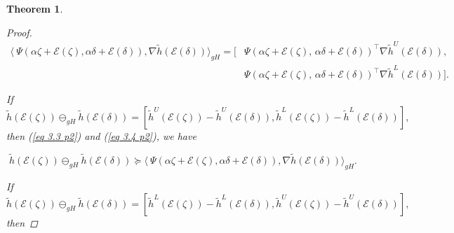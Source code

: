 \documentclass[12pt, reqno]{amsart}
\newtheorem{theorem}{Theorem}[section]
\theoremstyle{definition}
\theoremstyle{remark}
\numberwithin{equation}{section}
\begin{document}
\begin{theorem}
\begin{proof}
\begin{equation*}
\begin{aligned}
    \langle\ {\Psi}( {\alpha} \mathit{\zeta} + \mathcal{\mathcal{E}}(\mathit{\zeta} ), {\alpha}\mathit{\delta} + \mathcal{\mathcal{E}}(\mathit{\delta} )),\nabla  \tilde{h}( \mathcal{\mathcal{E}}(\mathit{\delta} ))\rangle_{gH}
    = \big[
    &\Psi(\alpha \mathit{\zeta}  + \mathcal{\mathcal{E}}(\mathit{\zeta} ),\, \alpha \mathit{\delta}  + \mathcal{\mathcal{E}}(\mathit{\delta} ))^{\!\top}
    \nabla \tilde{h}^U(\mathcal{\mathcal{E}}(\mathit{\delta} )), \\
    &\Psi(\alpha \mathit{\zeta}  + \mathcal{\mathcal{E}}(\mathit{\zeta} ),\, \alpha \mathit{\delta}  + \mathcal{\mathcal{E}}(\mathit{\delta} ))^{\!\top}
    \nabla \tilde{h}^L(\mathcal{\mathcal{E}}(\mathit{\delta} )) 
    \big].
\end{aligned}
\end{equation*}


If 
\begin{equation*}
   \tilde{h}(\mathcal{\mathcal{E}}(\mathit{\zeta} )) \ominus_{gH}\tilde{h}(\mathcal{\mathcal{E}}(\mathit{\delta} )) = [\tilde{h}^U(\mathcal{\mathcal{E}}(\mathit{\zeta} )) - \tilde{h}^U(\mathcal{\mathcal{E}}(\mathit{\delta} )), \tilde{h}^L(\mathcal{\mathcal{E}}(\mathit{\zeta} )) - \tilde{h}^L(\mathcal{\mathcal{E}}(\mathit{\delta} ))],
\end{equation*} 
then (\ref{eq 3.3 p2}) and (\ref{eq 3.4 p2}), we have

\begin{equation*}
   \tilde{h}(\mathcal{\mathcal{E}}(\mathit{\zeta} )) \ominus_{gH}\tilde{h}(\mathcal{\mathcal{E}}(\mathit{\delta} )) \succeq \langle\ {\Psi}( {\alpha} \mathit{\zeta} + \mathcal{\mathcal{E}}(\mathit{\zeta} ), {\alpha}\mathit{\delta} + \mathcal{\mathcal{E}}(\mathit{\delta} )),\nabla  \tilde{h}( \mathcal{\mathcal{E}}(\mathit{\delta} ))\rangle_{gH}.
\end{equation*}

If 
\begin{equation*}
   \tilde{h}(\mathcal{\mathcal{E}}(\mathit{\zeta} )) \ominus_{gH}\tilde{h}(\mathcal{\mathcal{E}}(\mathit{\delta} ) ) = [\tilde{h}^L(\mathcal{\mathcal{E}}(\mathit{\zeta} )) - \tilde{h}^L(\mathcal{\mathcal{E}}(\mathit{\delta} )), \tilde{h}^U(\mathcal{\mathcal{E}}(\mathit{\zeta} )) - \tilde{h}^U(\mathcal{\mathcal{E}}(\mathit{\delta} ))],
\end{equation*} 
then


\end{proof}
\end{theorem}
\end{document}
